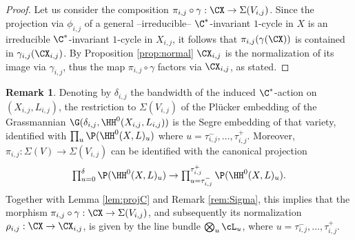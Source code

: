 \documentclass[reqno]{amsproc}
\theoremstyle{definition}
\newtheorem{remark}[theorem]{Remark}
\begin{document}
\begin{proof}
Let us consider the composition $\pi_{i,j}\circ\gamma:\CX\to \Sigma(V_{i,j})$. Since the projection via $\phi_{i,j}$ of a general --irreducible-- $\C^*$-invariant $1$-cycle in $X$ is an irreducible $\C^*$-invariant $1$-cycle in $X_{i,j}$, it follows that $\pi_{i,j}(\gamma(\CX))$ is contained in $\gamma_{i,j}(\CX_{i,j})$. By Proposition \ref{prop:normal} $\CX_{i,j}$ is the normalization of its image via $\gamma_{i,j}$, thus the map $\pi_{i,j}\circ\gamma$ factors via $\CX_{i,j}$, as stated.
\end{proof}

\begin{remark}\label{rem:projC1}
Denoting by $\delta_{i,j}$ the bandwidth of the induced $\C^*$-action on $(X_{i,j}, L_{i,j})$, the restriction to $\Sigma(V_{i,j})$ of the Pl\"ucker embedding of the Grassmannian $\G(\delta_{i,j},\HH^0(X_{i,j},L_{i,j}))$  is the Segre embedding of that variety, identified with $\prod_u \P(\HH^0(X,L)_{u}) $ where $u=\tau_{i,j}^-, \dots, \tau_{i,j}^+$. Moreover,  
$\pi_{i,j}:\Sigma(V)\to \Sigma(V_{i,j})$ can be identified with the canonical projection 
\[\textstyle \prod_{u=0}^{\delta}\P(\HH^0(X,L)_{u}) \to \prod_{u=\tau_{i,j}^-}^{\tau_{i,j}^+}\P(\HH^0(X,L)_{u}).\] Together with Lemma \ref{lem:projC} and Remark \ref{rem:Sigma}, this implies that the morphism $\pi_{i,j}\circ\gamma:\CX\to \Sigma(V_{i,j})$, and subsequently its normalization $\rho_{i,j}:\CX\to \CX_{i,j}$,  is given by the line bundle $\bigotimes_u 
{\cL_u}$, where $u=\tau_{i,j}^-, \dots, \tau_{i,j}^+$. 
\end{remark}
\end{document}
